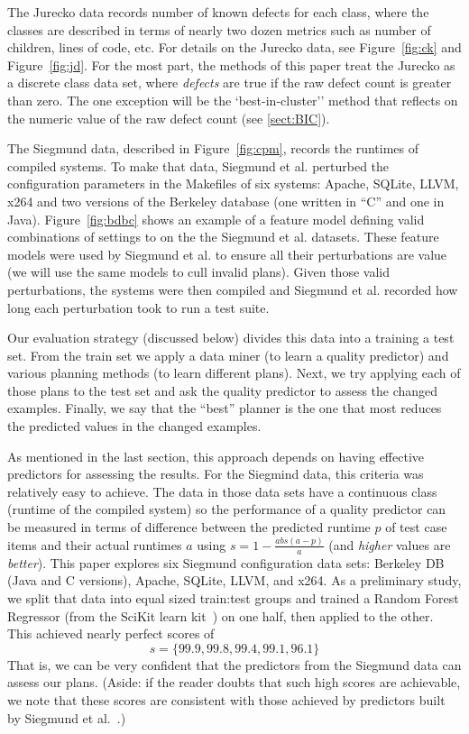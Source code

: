 \documentclass{sig-alternate}
\newcommand{\tion}[1]{\textsection\ref{sect:#1}}
\newcommand{\fig}[1]{Figure~\ref{fig:#1}}
\begin{document}
  
   The Jurecko data records number of known defects for each class, where the classes are described in terms of
  nearly two dozen metrics such as number of children, lines of code, etc. For details on the Jurecko data, see  \fig{ck} and \fig{jd}. 
 For the most part, the methods of this paper treat
  the Jurecko as a discrete class data set, where {\em defects} are true if the raw defect count is greater than zero.
  The one exception will be the `best-in-cluster'' method that reflects on the numeric value of the raw defect count (see \tion{BIC}).

  The Siegmund data, described in \fig{cpm},  records  the runtimes of compiled systems. To make that data, Siegmund et al. perturbed
  the configuration parameters in the Makefiles of six systems: Apache, SQLite, LLVM, x264 and two versions of the
  Berkeley database (one written in ``C'' and one in Java). 
   \fig{bdbc} shows an example of a feature model defining valid combinations of settings to on the
   the Siegmund et al. datasets. These feature models were used by Siegmund et al. to ensure all their perturbations are value
   (we will use the same models to cull invalid plans).
  Given those valid perturbations, the systems were then compiled and 
  Siegmund et al. recorded how long each perturbation took to run a test suite. 
  
  


  Our evaluation strategy (discussed below) divides this data into a training a test set.
  From the train set we apply a data miner (to learn a quality predictor) and
  various planning methods (to learn different plans). Next, we try applying
  each of those plans to the  test set and ask the quality predictor to assess the changed examples.
  Finally, we say that the  ``best'' planner is the one that most reduces the predicted values
  in the changed examples.
  
  As mentioned in the last section,  this approach depends on having effective predictors for assessing the results.
  For the Siegmind data, this criteria was   relatively easy to achieve.
  The data in those data sets have a continuous class (runtime of the compiled system)
  so the performance of a quality predictor can  be measured in terms of  difference between the predicted runtime $p$ of test case items and their actual runtimes $a$ using  $s= 1 - \frac{abs(a - p)}{a}$ (and {\em higher} values are {\em better}).
This paper  explores six Siegmund configuration data sets:  Berkeley DB (Java and C versions), Apache, SQLite, LLVM, and
  x264. 
  As a preliminary study, we split that data   into equal sized train:test groups
  and trained a Random Forest
  Regressor (from the SciKit learn kit~\cite{Pedregosa2012})   on one half, then applied to the other. This  achieved nearly perfect scores of \[s=\{99.9, 99.8, 99.4, 99.1, 96.1\}\] 
That is, we can be very confident that the predictors from the Siegmund data can assess
our plans. (Aside: if the reader doubts that such high scores are achievable, we note that these scores are consistent with those achieved by predictors built by Siegmund et al.~\cite{sven12}.)
\end{document}
